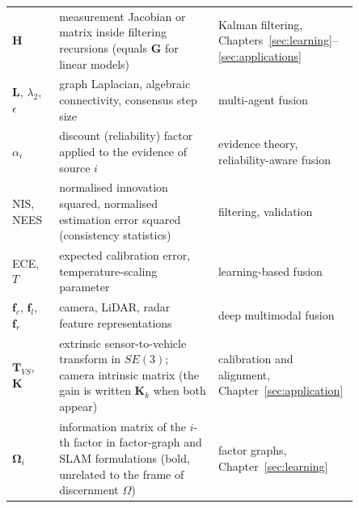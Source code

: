 \documentclass[graybox,envcountchap]{style/SNmono}
\begin{document}
\begin{table}[!t]
\begin{tabular}{p{0.13\linewidth} p{0.44\linewidth} p{0.28\linewidth}}
        $\mathbf{H}$ & measurement Jacobian or matrix inside filtering recursions (equals $\mathbf{G}$ for linear models) & Kalman filtering, Chapters~\ref{sec:learning}--\ref{sec:applications} \\
        $\mathbf{L}$, $\lambda_2$, $\epsilon$ & graph Laplacian, algebraic connectivity, consensus step size & multi-agent fusion \\
        $\alpha_i$ & discount (reliability) factor applied to the evidence of source $i$ & evidence theory, reliability-aware fusion \\
        NIS, NEES & normalised innovation squared, normalised estimation error squared (consistency statistics) & filtering, validation \\
        ECE, $T$ & expected calibration error, temperature-scaling parameter & learning-based fusion \\
        $\mathbf{f}_c$, $\mathbf{f}_l$, $\mathbf{f}_r$ & camera, LiDAR, radar feature representations & deep multimodal fusion \\
        $\mathbf{T}_{VS}$, $\mathbf{K}$ & extrinsic sensor-to-vehicle transform in $SE(3)$; camera intrinsic matrix (the gain is written $\mathbf{K}_k$ when both appear) & calibration and alignment, Chapter~\ref{sec:application} \\
        $\mathbf{\Omega}_i$ & information matrix of the $i$-th factor in factor-graph and SLAM formulations (bold, unrelated to the frame of discernment $\Omega$) & factor graphs, Chapter~\ref{sec:learning} \\
        \hline
    \end{tabular}
\end{table}
\end{document}
